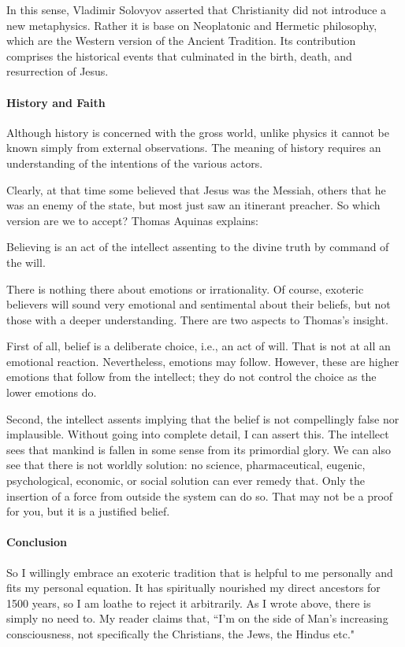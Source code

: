 In this sense, Vladimir Solovyov asserted that Christianity did not introduce a new metaphysics. Rather it is base on Neoplatonic and Hermetic philosophy, which are the Western version of the Ancient Tradition. Its contribution comprises the historical events that culminated in the birth, death, and resurrection of Jesus.

\paragraph{History and Faith}
Although history is concerned with the gross world, unlike physics it cannot be known simply from external observations. The meaning of history requires an understanding of the intentions of the various actors.

Clearly, at that time some believed that Jesus was the Messiah, others that he was an enemy of the state, but most just saw an itinerant preacher. So which version are we to accept? Thomas Aquinas explains:

\begin{quotex}
Believing is an act of the intellect assenting to the divine truth by command of the will.

\end{quotex}
There is nothing there about emotions or irrationality. Of course, exoteric believers will sound very emotional and sentimental about their beliefs, but not those with a deeper understanding. There are two aspects to Thomas's insight.

First of all, belief is a deliberate choice, i.e., an act of will. That is not at all an emotional reaction. Nevertheless, emotions may follow. However, these are higher emotions that follow from the intellect; they do not control the choice as the lower emotions do.

Second, the intellect assents implying that the belief is not compellingly false nor implausible. Without going into complete detail, I can assert this. The intellect sees that mankind is fallen in some sense from its primordial glory. We can also see that there is not worldly solution: no science, pharmaceutical, eugenic, psychological, economic, or social solution can ever remedy that. Only the insertion of a force from outside the system can do so. That may not be a proof for you, but it is a justified belief.

\paragraph{Conclusion}
So I willingly embrace an exoteric tradition that is helpful to me personally and fits my personal equation. It has spiritually nourished my direct ancestors for 1500 years, so I am loathe to reject it arbitrarily. As I wrote above, there is simply no need to. My reader claims that, ``I'm on the side of Man's increasing consciousness, not specifically the Christians, the Jews, the Hindus etc."

